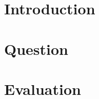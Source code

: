 

\usepackage{upgreek}
\usepackage{siunitx}




%
\section{Introduction}

\section{Question}

\section{Evaluation}




%     




\label{Ende Literatur}



\label{Ende Anhang}


